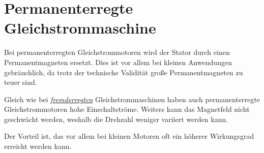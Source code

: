 \section{Permanenterregte Gleichstrommaschine}

Bei permanenterregten Gleichstrommotoren wird der Stator durch einen Permanentmagneten ersetzt.
Dies ist vor allem bei kleinen Anwendungen gebräuchlich, da trotz der technische Validität große Permanentmagneten zu teuer sind.

Gleich wie bei \hyperref[fremd]{\textit{fremderregten}} Gleichstrommaschinen haben auch permanenterregte Gleichstrommotoren hohe Einschaltströme.
Weiters kann das Magnetfeld nicht geschwächt werden, weshalb die Drehzahl weniger variiert werden kann.

Der Vorteil ist, das vor allem bei kleinen Motoren oft ein höherer Wirkungsgrad erreicht werden kann.

\cite{dcdewiki:208635995}